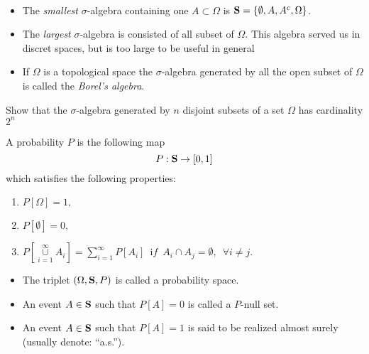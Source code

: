 \begin{examples}
\ 

\begin{itemize}
\item The \emph{smallest} $\sigma$-algebra containing one $A\subset \Omega$ is $\mathbf{S}=\{\emptyset, A,A^c,\Omega\}$.


\item  The \emph{largest}  $\sigma$-algebra is consisted of all subset  of $\Omega$. This  algebra served us in discret spaces, but is too large to be useful in general

\item If $\Omega$ is a topological space the $\sigma$-algebra generated by all the open subset of $\Omega$ is called the \emph{Borel's algebra}.
\end{itemize}
\end{examples}

\begin{ex}\label{Ex:6.1}
    Show that the $\sigma$-algebra generated by $n$ disjoint subsets of a set $\Omega$ has cardinality $2^n$
\end{ex}



 \begin{definition}
 A probability $P$ is the following map  $$P: {\mathbf{S}}\to [0,1]$$ which
satisfies the following properties: 

\begin{enumerate}
\item $P[\Omega] = 1,$
\item $ P[\emptyset] = 0,$
\item $ P[\mathop{\cup}\limits_{i=1}^\infty A_i] =
\sum\limits_{i=1}^\infty P[A_i]\enspace {\mathrm if}\enspace  A_i\cap A_j =
\emptyset,\enspace
 \forall  i \not= j.$
\end{enumerate}
\end{definition}

\begin{itemize}
\item The triplet
$(\Omega,{\mathbf{S}},P)$ is called a probability space.

\item An event $A \in {\mathbf{S}}$ such that $P[A] = 0$ is called a $P$-null set.

\item An event $A \in {\mathbf{S}}$ such that $P[A] = 1$  is said to be realized
almost surely (usually denote: ``a.s.'').
\end{itemize}

